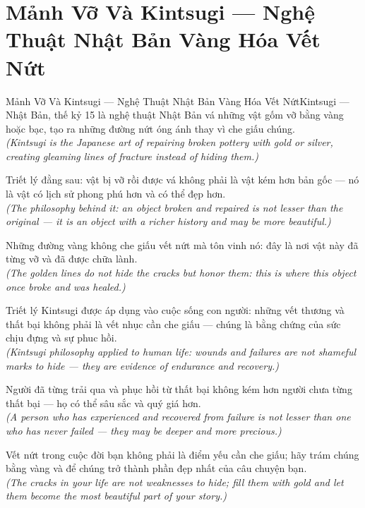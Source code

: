 \section{Mảnh Vỡ Và Kintsugi --- Nghệ Thuật Nhật Bản Vàng Hóa Vết Nứt}
\begin{truyen}{Mảnh Vỡ Và Kintsugi --- Nghệ Thuật Nhật Bản Vàng Hóa Vết Nứt}{Kintsugi --- Nhật Bản, thế kỷ 15}
 là nghệ thuật Nhật Bản vá những vật gốm vỡ bằng vàng hoặc bạc, tạo ra những đường nứt óng ánh thay vì che giấu chúng.\\[4pt]
\textit{(Kintsugi is the Japanese art of repairing broken pottery with gold or silver, creating gleaming lines of fracture instead of hiding them.)}

Triết lý đằng sau: vật bị vỡ rồi được vá không phải là vật kém hơn bản gốc --- nó là vật có lịch sử phong phú hơn và có thể đẹp hơn.\\[4pt]
\textit{(The philosophy behind it: an object broken and repaired is not lesser than the original --- it is an object with a richer history and may be more beautiful.)}

Những đường vàng không che giấu vết nứt mà tôn vinh nó: đây là nơi vật này đã từng vỡ và đã được chữa lành.\\[4pt]
\textit{(The golden lines do not hide the cracks but honor them: this is where this object once broke and was healed.)}

Triết lý Kintsugi được áp dụng vào cuộc sống con người: những vết thương và thất bại không phải là vết nhục cần che giấu --- chúng là bằng chứng của sức chịu đựng và sự phuc hồi.\\[4pt]
\textit{(Kintsugi philosophy applied to human life: wounds and failures are not shameful marks to hide --- they are evidence of endurance and recovery.)}

Người đã từng trải qua và phục hồi từ thất bại không kém hơn người chưa từng thất bại --- họ có thể sâu sắc và quý giá hơn.\\[4pt]
\textit{(A person who has experienced and recovered from failure is not lesser than one who has never failed --- they may be deeper and more precious.)}

\end{truyen}
\begin{baihoc}
  Vết nứt trong cuộc đời bạn không phải là điểm yếu cần che giấu; hãy trám chúng bằng vàng và để chúng trở thành phần đẹp nhất của câu chuyện bạn.\\[4pt]
  \textit{(The cracks in your life are not weaknesses to hide; fill them with gold and let them become the most beautiful part of your story.)}
\end{baihoc}
